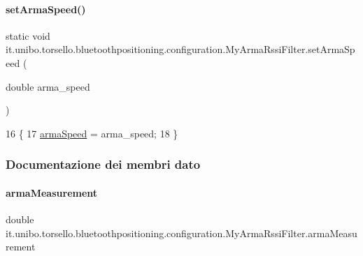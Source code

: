 \paragraph{\texorpdfstring{set\+Arma\+Speed()}{setArmaSpeed()}}
{\footnotesize\ttfamily static void it.\+unibo.\+torsello.\+bluetoothpositioning.\+configuration.\+My\+Arma\+Rssi\+Filter.\+set\+Arma\+Speed (\begin{DoxyParamCaption}\item[{double}]{arma\+\_\+speed }\end{DoxyParamCaption})\hspace{0.3cm}{\ttfamily [static]}}


\begin{DoxyCode}
16                                                        \{
17         \hyperlink{classit_1_1unibo_1_1torsello_1_1bluetoothpositioning_1_1configuration_1_1MyArmaRssiFilter_a5332b55e26b28536d1f8c7cae5e684b4_a5332b55e26b28536d1f8c7cae5e684b4}{armaSpeed} = arma\_speed;
18     \}
\end{DoxyCode}


\subsubsection{Documentazione dei membri dato}
\hypertarget{classit_1_1unibo_1_1torsello_1_1bluetoothpositioning_1_1configuration_1_1MyArmaRssiFilter_a2be11d7395143321b8f2063afe14a8d0_a2be11d7395143321b8f2063afe14a8d0}{}\label{classit_1_1unibo_1_1torsello_1_1bluetoothpositioning_1_1configuration_1_1MyArmaRssiFilter_a2be11d7395143321b8f2063afe14a8d0_a2be11d7395143321b8f2063afe14a8d0} 
\paragraph{\texorpdfstring{arma\+Measurement}{armaMeasurement}}
{\footnotesize\ttfamily double it.\+unibo.\+torsello.\+bluetoothpositioning.\+configuration.\+My\+Arma\+Rssi\+Filter.\+arma\+Measurement\hspace{0.3cm}{\ttfamily [private]}}

